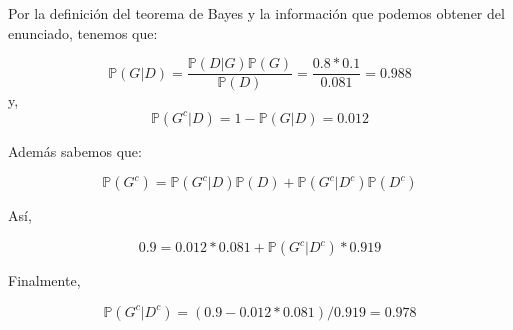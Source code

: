 \begin{solution}
Por la definición del teorema de Bayes y la información que podemos obtener del enunciado, tenemos que:

$$\mathbb{P}(G|D)=\frac{\mathbb{P}(D|G) \mathbb{P}(G)}{\mathbb{P}(D)} =\dfrac{0.8*0.1}{0.081}=0.988 $$
y,
$$\mathbb{P}(G^c|D)=1-\mathbb{P}(G|D)=0.012$$

Además sabemos que:

$$\mathbb{P}(G^c)= \mathbb{P}(G^c|D)\mathbb{P}(D) + \mathbb{P}(G^c|D^c)\mathbb{P}(D^c)$$

Así,

$$0.9=0.012*0.081 + \mathbb{P}(G^c|D^c)*0.919$$

Finalmente,

$$\mathbb{P}(G^c|D^c)=(0.9-0.012*0.081)/0.919=0.978$$

\end{solution}